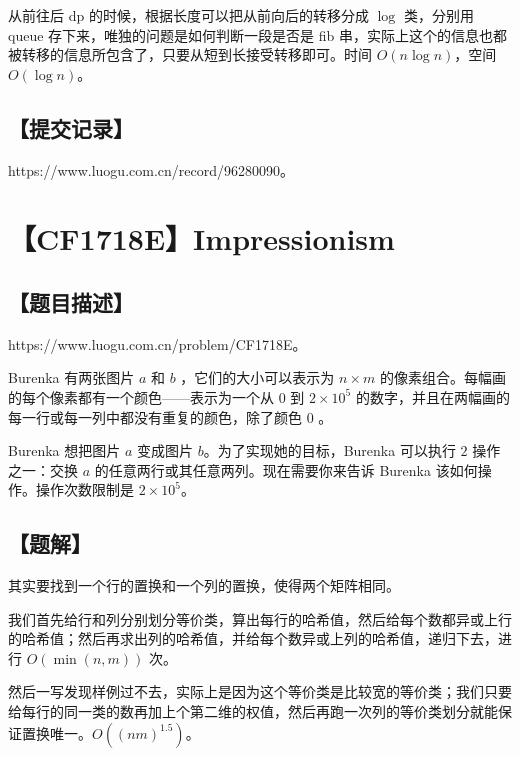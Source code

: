 \documentclass[UTF8,12pt,a4paper]{ctexart}
\begin{document}
	从前往后 dp 的时候，根据长度可以把从前向后的转移分成 $\log$ 类，分别用 queue 存下来，唯独的问题是如何判断一段是否是 fib 串，实际上这个的信息也都被转移的信息所包含了，只要从短到长接受转移即可。时间 $O(n\log n)$，空间 $O(\log n)$。
	
	\subsection*{【提交记录】}
	
	https://www.luogu.com.cn/record/96280090。
	
	
	\section*{【CF1718E】Impressionism}
	
	\subsection*{【题目描述】}
	
	https://www.luogu.com.cn/problem/CF1718E。
	
	Burenka 有两张图片 $ a $ 和 $ b$ ，它们的大小可以表示为 $ n \times m $ 的像素组合。每幅画的每个像素都有一个颜色——表示为一个从 $0 $ 到 $2 \times 10^5$ 的数字，并且在两幅画的每一行或每一列中都没有重复的颜色，除了颜色 $0 $ 。
	
	Burenka 想把图片 $a$ 变成图片 $b$。为了实现她的目标，Burenka 可以执行 $2$ 操作之一：交换 $a$ 的任意两行或其任意两列。现在需要你来告诉 Burenka 该如何操作。操作次数限制是 $2\times 10^5$。
	
	\subsection*{【题解】}
	
	其实要找到一个行的置换和一个列的置换，使得两个矩阵相同。
	
	我们首先给行和列分别划分等价类，算出每行的哈希值，然后给每个数都异或上行的哈希值；然后再求出列的哈希值，并给每个数异或上列的哈希值，递归下去，进行 $O(\min(n,m))$ 次。
	
	然后一写发现样例过不去，实际上是因为这个等价类是比较宽的等价类；我们只要给每行的同一类的数再加上个第二维的权值，然后再跑一次列的等价类划分就能保证置换唯一。$O((nm)^{1.5})$。
	
\end{document}
